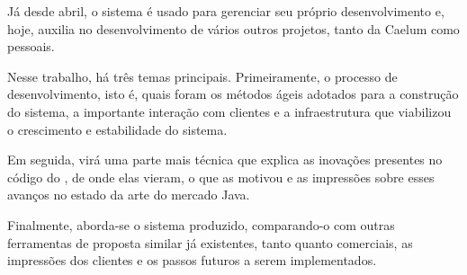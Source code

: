 Já desde abril, o sistema é usado para gerenciar seu próprio desenvolvimento e, hoje, auxilia no desenvolvimento de vários outros projetos, tanto da Caelum como pessoais. 

Nesse trabalho, há três temas principais. Primeiramente, o processo de desenvolvimento, isto é, quais foram os métodos ágeis adotados para a construção do sistema, a importante interação com clientes e a infraestrutura que viabilizou o crescimento e estabilidade do sistema. 

Em seguida, virá uma parte mais técnica que explica as inovações presentes no código do \calopsita{}, de onde elas vieram, o que as motivou e as impressões sobre esses avanços no estado da arte do mercado Java.

Finalmente, aborda-se o sistema produzido, comparando-o com outras ferramentas de proposta similar já existentes, tanto \opensource{} quanto comerciais, as impressões dos clientes e os passos futuros a serem implementados.
